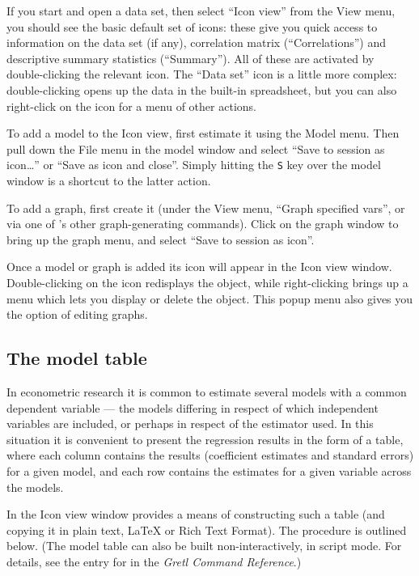 If you start  and open a data set, then select ``Icon
view'' from the View menu, you should see the basic default set of
icons: these give you quick access to information on the data set (if
any), correlation matrix (``Correlations'') and descriptive summary
statistics (``Summary''). All of these are activated by
double-clicking the relevant icon.  The ``Data set'' icon is a little
more complex: double-clicking opens up the data in the built-in
spreadsheet, but you can also right-click on the icon for a menu of
other actions.

To add a model to the Icon view, first estimate it using the Model
menu.  Then pull down the File menu in the model window and select
``Save to session as icon\dots{}'' or ``Save as icon and close''.
Simply hitting the \verb+S+ key over the model window is a shortcut to
the latter action.

To add a graph, first create it (under the View menu, ``Graph
specified vars'', or via one of 's other graph-generating
commands).  Click on the graph window to bring up the graph menu, and
select ``Save to session as icon''.

Once a model or graph is added its icon will appear in the Icon view
window.  Double-clicking on the icon redisplays the object, while
right-clicking brings up a menu which lets you display or delete the
object.  This popup menu also gives you the option of editing graphs.

\subsection{The model table}
\label{model-table}

In econometric research it is common to estimate several models with a
common dependent variable --- the models differing in respect of which
independent variables are included, or perhaps in respect of the
estimator used.  In this situation it is convenient to present the
regression results in the form of a table, where each column contains
the results (coefficient estimates and standard errors) for a given
model, and each row contains the estimates for a given variable across
the models.  

In the Icon view window  provides a means of constructing
such a table (and copying it in plain text, {\LaTeX} or Rich Text
Format).  The procedure is outlined below.  (The model table can also
be built non-interactively, in script mode.  For details, see the
entry for  in the \emph{Gretl Command Reference}.)

